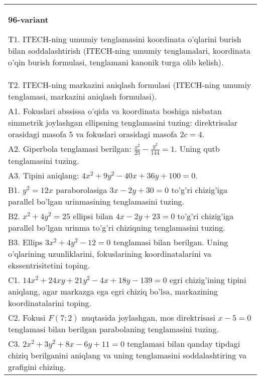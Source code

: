 \documentclass{article}
\begin{document}
\begin{tabular}{m{17cm}}
\textbf{96-variant}
\newline

T1. ITECH-ning umumiy tenglamasini koordinata o'qlarini burish bilan soddalashtirish (ITECH-ning umumiy tenglamalari, koordinata o'qin burish formulasi, tenglamani kanonik turga olib kelish).\\

T2. ITECH-ning markazini aniqlash formulasi (ITECH-ning umumiy tenglamasi, markazini aniqlash formulasi).\\

A1. Fokuslari abssissa o'qida va koordinata boshiga nisbatan simmetrik joylashgan ellipsning tenglamasini tuzing: direktrisalar orasidagi masofa $5$ va fokuslari orasidagi masofa $2c=4$.\\

A2. Giperbola tenglamasi berilgan: $\frac{x^{2}}{25}-\frac{y^{2}}{144}=1$. Uning qutb tenglamasini tuzing.\\

A3. Tipini aniqlang: $4x^2+9y^2-40x+36y+100=0$.\\

B1. $y^{2} = 12x$ paraborolasiga $3x - 2y + 30 = 0$ to'g'ri chizig'iga parallel bo'lgan urinmasining tenglamasini tuzing.  \\

B2. $x^{2} + 4y^{2} = 25$ ellipsi bilan $4x - 2y + 23 = 0$ to'g'ri chizig'iga parallel bo'lgan urinma to'g'ri chiziqning tenglamasini tuzing.  \\

B3. Ellips $3x^{2} + 4y^{2} - 12 = 0$ tenglamasi bilan berilgan. Uning o'qlarining uzunliklarini, fokuslarining koordinatalarini va ekssentrisitetini toping.  \\

C1. $14x^{2} + 24xy + 21y^{2} - 4x + 18y - 139 = 0$ egri chizig'ining tipini aniqlang, agar markazga ega egri chiziq bo'lsa, markazining koordinatalarini toping.  \\

C2. Fokusi $F(7;2)$ nuqtasida joylashgan, mos direktrisasi $x - 5 = 0$ tenglamasi bilan berilgan parabolaning tenglamasini tuzing.  \\

C3. $2x^{2} + 3y^{2} + 8x - 6y + 11 = 0$ tenglamasi bilan qanday tipdagi chiziq berilganini aniqlang va uning tenglamasini soddalashtiring va grafigini chizing.  \\

\end{tabular}
\vspace{1cm}
\end{document}
